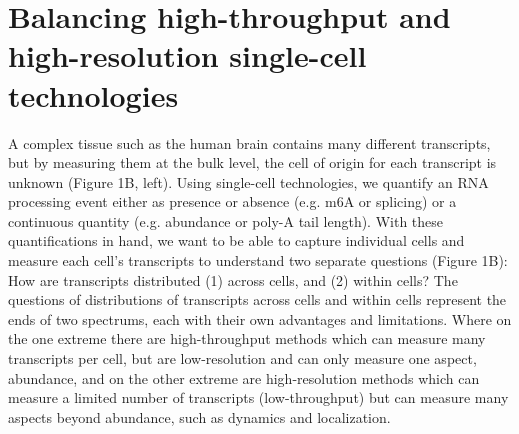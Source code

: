 \section{Balancing high-throughput and high-resolution single-cell technologies}

A complex tissue such as the human brain contains many different transcripts, but by measuring them at the bulk level, the cell of origin for each transcript is unknown (Figure 1B, left). Using single-cell technologies, we quantify an RNA processing event either as presence or absence (e.g. m6A or splicing) or a continuous quantity (e.g. abundance or poly-A tail length). With these quantifications in hand, we want to be able to capture individual cells and measure each cell’s transcripts to understand two separate questions (Figure 1B): How are transcripts distributed (1) across cells, and (2) within cells?
	The questions of distributions of transcripts across cells and within cells represent the ends of two spectrums, each with their own advantages and limitations. Where on the one extreme there are high-throughput methods which can measure many transcripts per cell, but are low-resolution and can only measure one aspect, abundance, and on the other extreme are high-resolution methods which can measure a limited number of transcripts (low-throughput) but can measure many aspects beyond abundance, such as dynamics and localization.

